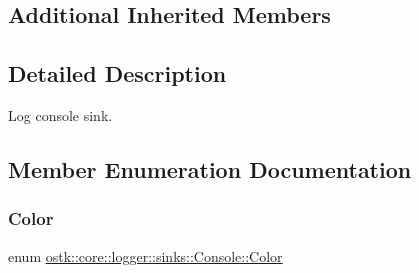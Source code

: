 \subsection*{Additional Inherited Members}


\subsection{Detailed Description}
Log console sink. 

\subsection{Member Enumeration Documentation}
\mbox{\label{classostk_1_1core_1_1logger_1_1sinks_1_1_console_abfacace5be69257cad68f802040c050b}} 
\subsubsection{\texorpdfstring{Color}{Color}}
{\footnotesize\ttfamily enum \hyperlink{classostk_1_1core_1_1logger_1_1sinks_1_1_console_abfacace5be69257cad68f802040c050b}{ostk\+::core\+::logger\+::sinks\+::\+Console\+::\+Color}\hspace{0.3cm}{\ttfamily [strong]}}

